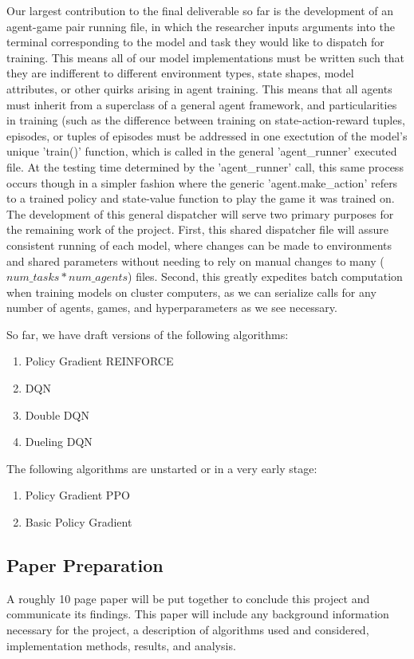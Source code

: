 \documentclass[conference]{IEEEtran}
\begin{document}
Our largest contribution to the final deliverable so far is the development of an agent-game pair running file, in which the researcher inputs arguments into the terminal corresponding to the model and task they would like to dispatch for training. This means all of our model implementations must be written such that they are indifferent to different environment types, state shapes, model attributes, or other quirks arising in agent training. This means that all agents must inherit from a superclass of a general agent framework, and particularities in training (such as the difference between training on state-action-reward tuples, episodes, or tuples of episodes must be addressed in one exectution of the model's unique 'train()' function, which is called in the general 'agent\_runner' executed file.
At the testing time determined by the 'agent\_runner' call, this same process occurs though in a simpler fashion where the generic 'agent.make\_action' refers to a trained policy and state-value function to play the game it was trained on.
The development of this general dispatcher will serve two primary purposes for the remaining work of the project. First, this shared dispatcher file will assure consistent running of each model, where changes can be made to environments and shared parameters without needing to rely on manual changes to many ($num\_tasks*num\_agents$) files. Second, this greatly expedites batch computation when training models on cluster computers, as we can serialize calls for any number of agents, games, and hyperparameters as we see necessary.

So far, we have draft versions of the following algorithms:
\begin{enumerate}
\item Policy Gradient REINFORCE
\item DQN
\item Double DQN
\item Dueling DQN
\end{enumerate}

The following algorithms are unstarted or in a very early stage:
\begin{enumerate}
\item Policy Gradient PPO
\item Basic Policy Gradient
\end{enumerate}

\subsection{Paper Preparation}
A roughly 10 page paper will be put together to conclude this project and communicate its findings.
This paper will include any background information necessary for the project, a description of algorithms used and considered, implementation methods, results, and analysis.
\end{document}

